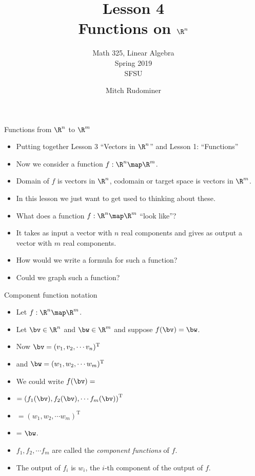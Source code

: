 \documentclass{beamer}
\title{Lesson 4 \\ Functions on $\R^n$}
\subtitle{Math 325, Linear Algebra \\ Spring 2019 \\ SFSU}
\author{Mitch Rudominer}
\date{}
\begin{document}
\begin{frame}
  \titlepage
\end{frame}


\beamerdefaultoverlayspecification{<+->}

\begin{frame}{Functions from $\R^n$ to $\R^m$}

\begin{itemize}
\item Putting together Lesson 3 ``Vectors in $\R^n$'' and Lesson 1: ``Functions''
\item Now we consider a function $f:\R^n \map \R^m$.
\item Domain of $f$ is vectors in $\R^n$, codomain or target space is vectors
in $\R^m$.
\item In this lesson we just want to get used to thinking about these.
\item What does a function $f:\R^n \map \R^m$ ``look like''?
\item It takes as input a vector with $n$ real components and gives as output
a vector with $m$ real components.
\item How would we write a formula for such a function?
\item Could we graph such a function?
\end{itemize}

\end{frame}

\begin{frame}{Component function notation}

\begin{itemize}
\item Let $f:\R^n \map \R^m$.
\item Let $\bv \in \R^n$ and $\bw \in \R^m$ and suppose $f(\bv) = \bw$.
\item Now $\bv = (v_1, v_2, \cdots v_n)^{\text{T}}$
\item and $\bw = (w_1, w_2, \cdots w_m)^{\text{T}}$
\item We could write $f(\bv) =$
\item $ = \left(f_1(\bv), f_2(\bv), \cdots f_m(\bv)\right)^{\text{T}}$
\item $= (w_1, w_2, \cdots w_m)^{\text{T}}$
\item = $\bw$.
\item $f_1,f_2,\cdots f_m$ are called the \emph{component functions} of $f$.
\item The output of $f_i$ is $w_i$, the $i$-th component of the output of $f$.
\end{itemize}

\end{frame}
\end{document}
